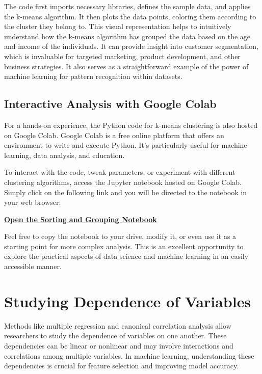 \documentclass[a4paper,12pt]{book}
\newcounter{example}
\begin{document}
The code first imports necessary libraries, defines the sample data, and applies the k-means algorithm. It then plots the data points, coloring them according to the cluster they belong to. This visual representation helps to intuitively understand how the k-means algorithm has grouped the data based on the age and income of the individuals. It can provide insight into customer segmentation, which is invaluable for targeted marketing, product development, and other business strategies. It also serves as a straightforward example of the power of machine learning for pattern recognition within datasets.

\subsection{Interactive Analysis with Google Colab}
For a hands-on experience, the Python code for k-means clustering is also hosted on Google Colab. Google Colab is a free online platform that offers an environment to write and execute Python. It's particularly useful for machine learning, data analysis, and education.

To interact with the code, tweak parameters, or experiment with different clustering algorithms, access the Jupyter notebook hosted on Google Colab. Simply click on the following link and you will be directed to the notebook in your web browser:

\begin{center}
\href{https://colab.research.google.com/drive/1C4Rnja-fjwVB6GI5h1vYItJ5fbxDHlxh}{\textbf{Open the Sorting and Grouping Notebook}}
\end{center}

Feel free to copy the notebook to your drive, modify it, or even use it as a starting point for more complex analysis. This is an excellent opportunity to explore the practical aspects of data science and machine learning in an easily accessible manner.

\section{Studying Dependence of Variables}
Methods like multiple regression and canonical correlation analysis allow researchers to study the dependence of variables on one another. These dependencies can be linear or nonlinear and may involve interactions and correlations among multiple variables. In machine learning, understanding these dependencies is crucial for feature selection and improving model accuracy.
\end{document}
